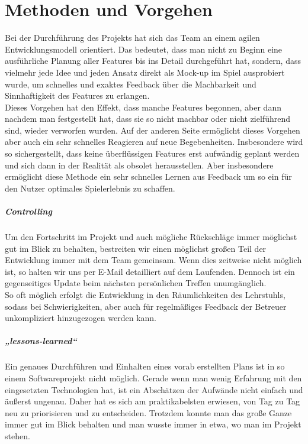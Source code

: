 \chapter{Methoden und Vorgehen}
Bei der Durchführung des Projekts hat sich das Team an einem agilen Entwicklungsmodell orientiert. Das bedeutet, dass man nicht zu Beginn eine ausführliche Planung aller Features bis ins Detail durchgeführt hat, sondern, dass vielmehr jede Idee und jeden Ansatz direkt als Mock-up im Spiel ausprobiert wurde, um schnelles und exaktes Feedback über die Machbarkeit und Sinnhaftigkeit des Features zu erlangen.\\
Dieses Vorgehen hat den Effekt, dass manche Features begonnen, aber dann nachdem man festgestellt hat, dass sie so nicht machbar oder nicht zielführend sind, wieder verworfen wurden. Auf der anderen Seite ermöglicht dieses Vorgehen aber auch ein sehr schnelles Reagieren auf neue Begebenheiten. Insbesondere wird so sichergestellt, dass keine überflüssigen Features erst aufwändig geplant werden und sich dann in der Realität als obsolet herausstellen. Aber insbesondere ermöglicht diese Methode ein sehr schnelles Lernen aus Feedback um so ein für den Nutzer optimales Spielerlebnis zu schaffen.\\
\paragraph{Controlling}\noindent
Um den Fortschritt im Projekt und auch mögliche Rückschläge immer möglichst gut im Blick zu behalten, bestreiten wir einen möglichst großen Teil der Entwicklung immer mit dem Team gemeinsam. Wenn dies zeitweise nicht möglich ist, so halten wir uns per E-Mail detailliert auf dem Laufenden. Dennoch ist ein gegenseitiges Update beim nächsten persönlichen Treffen unumgänglich.\\
So oft möglich erfolgt die Entwicklung in den Räumlichkeiten des Lehrstuhls, sodass bei Schwierigkeiten, aber auch für regelmäßiges Feedback der Betreuer unkompliziert hinzugezogen werden kann.
\paragraph{„lessons-learned“}\noindent
Ein genaues Durchführen und Einhalten eines vorab erstellten Plans ist in so einem Softwareprojekt nicht möglich. Gerade wenn man wenig Erfahrung mit den eingesetzten Technologien hat, ist ein Abschätzen der Aufwände nicht einfach und äußerst ungenau. Daher hat es sich am praktikabelsten erwiesen, von Tag zu Tag neu zu priorisieren und zu entscheiden. Trotzdem konnte man das große Ganze immer gut im Blick behalten und man wusste immer in etwa, wo man im Projekt stehen.
